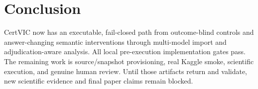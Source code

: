 \section{Conclusion}
CertVIC now has an executable, fail-closed path from outcome-blind controls and answer-changing
semantic interventions through multi-model import and adjudication-aware analysis. All local
pre-execution implementation gates pass. The remaining work is source/snapshot provisioning, real
Kaggle smoke, scientific execution, and genuine human review. Until those artifacts return and
validate, new scientific evidence and final paper claims remain blocked.
